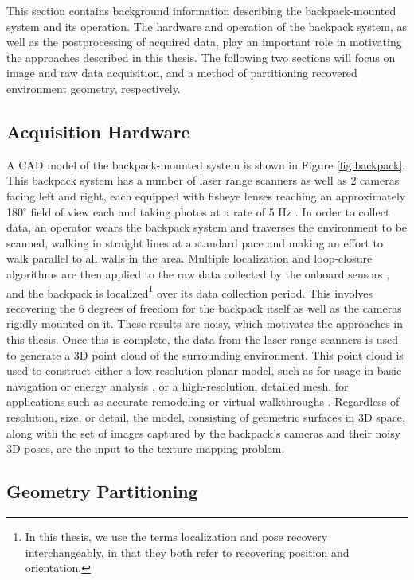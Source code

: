 \documentclass[]{spie}  %
\begin{document}
This section contains background information describing the
backpack-mounted system and its operation. The hardware and operation
of the backpack system, as well as the postprocessing of acquired
data, play an important role in motivating the approaches described in
this thesis. The following two sections will focus on image and raw
data acquisition, and a method of partitioning recovered environment
geometry, respectively.

\subsection{Acquisition Hardware}

A CAD model of the backpack-mounted system is shown in Figure
\ref{fig:backpack}. This backpack system has a number of laser range
scanners as well as 2 cameras facing left and right, each equipped
with fisheye lenses reaching an approximately 180$^{\circ}$ field of
view each and taking photos at a rate of 5 Hz \cite{liu2010indoor}. In
order to collect data, an operator wears the backpack system and
traverses the environment to be scanned, walking in straight lines at
a standard pace and making an effort to walk parallel to all walls in
the area. Multiple localization and loop-closure algorithms are then
applied to the raw data collected by the onboard sensors
\cite{chen2010indoor, kua2012loopclosure, liu2010indoor}, and the
backpack is localized\footnote{In this thesis, we use the terms
  localization and pose recovery interchangeably, in that they both
  refer to recovering position and orientation.}  over its data
collection period. This involves recovering the 6 degrees of freedom
for the backpack itself as well as the cameras rigidly mounted on it.
These results are noisy, which motivates the approaches in this
thesis. Once this is complete, the data from the laser range scanners
is used to generate a 3D point cloud of the surrounding
environment. This point cloud is used to construct either a
low-resolution planar model, such as for usage in basic navigation or
energy analysis \cite{sanchez2012point, turnerfloorplan}, or a
high-resolution, detailed mesh, for applications such as accurate
remodeling or virtual walkthroughs \cite{turnerwatertight}.
Regardless of resolution, size, or detail, the model, consisting of
geometric surfaces in 3D space, along with the set of images captured
by the backpack's cameras and their noisy 3D poses, are the input to
the texture mapping problem.

\subsection{Geometry Partitioning}
\label{sec:geometryPartitioning}
\end{document}
